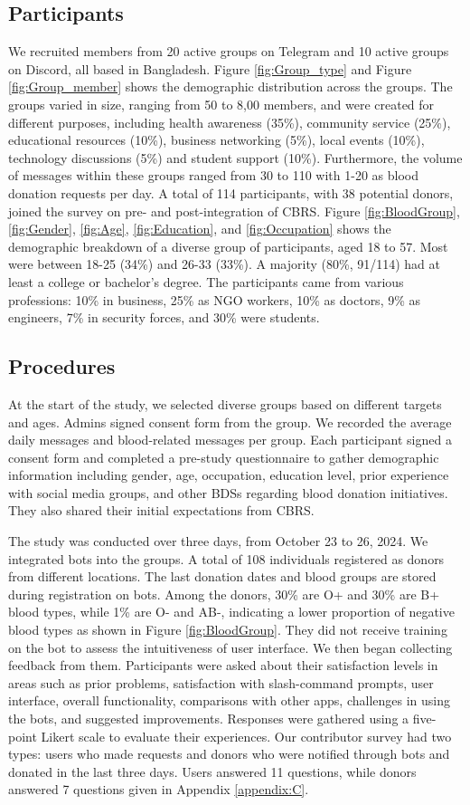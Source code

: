 \documentclass[11pt]{article}
\begin{document}
\subsection{Participants}
We recruited members from 20 active groups on Telegram and 10 active groups on Discord, all based in Bangladesh. Figure \ref{fig:Group_type} and Figure \ref{fig:Group_member} shows the demographic distribution across the groups. The groups varied in size, ranging from 50 to 8,00 members, and were created for different purposes, including health awareness (35\%), community service (25\%), educational resources (10\%), business networking (5\%), local events (10\%), technology discussions (5\%) and student support (10\%). Furthermore, the volume of messages within these groups ranged from 30 to 110 with 1-20 as blood donation requests per day. A total of 114 participants, with 38 potential donors, joined the survey on pre- and post-integration of CBRS. Figure \ref{fig:BloodGroup}, \ref{fig:Gender}, \ref{fig:Age}, \ref{fig:Education}, and \ref{fig:Occupation} shows the demographic breakdown of a diverse group of participants, aged 18 to 57. Most were between 18-25 (34\%) and 26-33 (33\%). A majority (80\%, 91/114) had at least a college or bachelor’s degree. The participants came from various professions: 10\% in business, 25\% as NGO workers, 10\% as doctors, 9\% as engineers, 7\% in security forces, and 30\% were students.
\subsection{Procedures}
At the start of the study, we selected diverse groups based on different targets and ages. Admins signed consent form from the group. We recorded the average daily messages and blood-related messages per group. Each participant signed a consent form and completed a pre-study questionnaire to gather demographic information including gender, age, occupation, education level, prior experience with social media groups, and other BDSs regarding blood donation initiatives. They also shared their initial expectations from CBRS.

The study was conducted over three days, from October 23 to 26, 2024. We integrated bots into the groups. A total of 108 individuals registered as donors from different locations. The last donation dates and blood groups are stored during registration on bots. Among the donors, 30\% are O+ and 30\% are B+ blood types, while 1\% are O- and AB-, indicating a lower proportion of negative blood types as shown in Figure \ref{fig:BloodGroup}. They did not receive training on the bot to assess the intuitiveness of user interface. We then began collecting feedback from them. Participants were asked about their satisfaction levels in areas such as prior problems, satisfaction with slash-command prompts, user interface, overall functionality, comparisons with other apps, challenges in using the bots, and suggested improvements. Responses were gathered using a five-point Likert scale to evaluate their experiences. Our contributor survey had two types: users who made requests and donors who were notified through bots and donated in the last three days. Users answered 11 questions, while donors answered 7 questions given in Appendix \ref{appendix:C}.
\end{document}
